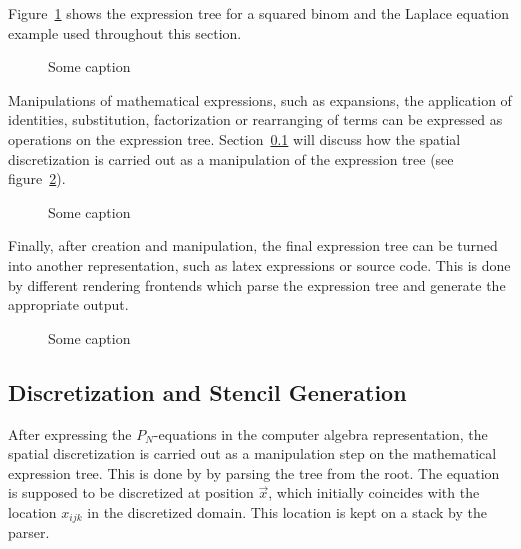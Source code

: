 Figure~\ref{fig:pn_math_expression_tree} shows the expression tree for a squared binom and the Laplace equation example used throughout this section.
\begin{figure}[h]
\centering
{}
\caption{Some caption}
\label{fig:pn_math_expression_tree}
\end{figure}

Manipulations of mathematical expressions, such as expansions, the application of identities, substitution, factorization or rearranging of terms can be expressed as operations on the expression tree. Section~\ref{sec:pn_stencil_gen} will discuss how the spatial discretization is carried out as a manipulation of the expression tree (see figure~\ref{fig:pn_math_expression_tree_manipulation}).
\begin{figure}[h]
\centering
{}
\caption{Some caption}
\label{fig:pn_math_expression_tree_manipulation}
\end{figure}

Finally, after creation and manipulation, the final expression tree can be turned into another representation, such as latex expressions or source code. This is done by different rendering frontends which parse the expression tree and generate the appropriate output.
\begin{figure}[h]
\centering
{}
\caption{Some caption}
\label{fig:pn_math_expression_tree_rendering}
\end{figure}

\subsection{Discretization and Stencil Generation}
\label{sec:pn_stencil_gen}

After expressing the $P_N$-equations in the computer algebra representation, the spatial discretization is carried out as a manipulation step on the mathematical expression tree. This is done by by parsing the tree from the root. The equation is supposed to be discretized at position $\vec{x}$, which initially coincides with the location $x_{ijk}$ in the discretized domain. This location is kept on a stack by the parser.

